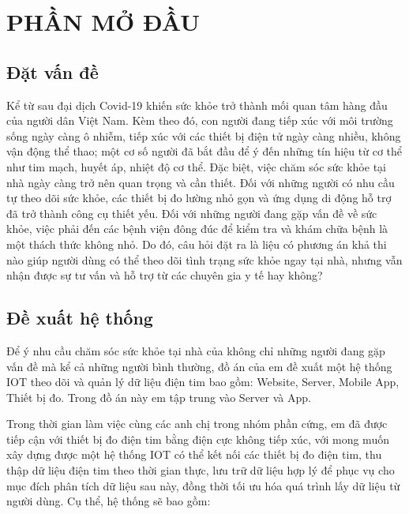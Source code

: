 
\section*{PHẦN MỞ ĐẦU}
\subsection*{Đặt vấn đề} 

Kể từ sau đại dịch Covid-19 khiến sức khỏe trở thành mối quan tâm hàng đầu của người dân Việt Nam. Kèm theo đó, con người đang tiếp xúc với môi trường sống ngày càng ô nhiễm, 
tiếp xúc với các thiết bị điện tử ngày càng nhiều, không vận động thể thao; một cơ số người đã bắt đầu để ý đến những tín hiệu từ cơ thể như tim mạch, huyết áp, nhiệt độ cơ thể.
Đặc biệt, việc chăm sóc sức khỏe tại nhà ngày càng trở nên quan trọng và cần thiết. 
Đối với những người có nhu cầu tự theo dõi sức khỏe, các thiết bị đo lường nhỏ gọn và ứng dụng di động hỗ trợ đã trở thành công cụ thiết yếu. 
Đối với những người đang gặp vấn đề về sức khỏe, việc phải đến các bệnh viện đông đúc để kiểm tra và khám chữa bệnh là một thách thức không nhỏ. 
Do đó, câu hỏi đặt ra là liệu có phương án khả thi nào giúp người dùng có thể theo dõi tình trạng sức khỏe ngay tại nhà, 
nhưng vẫn nhận được sự tư vấn và hỗ trợ từ các chuyên gia y tế hay không?

\subsection*{Đề xuất hệ thống}

Để ý nhu cầu chăm sóc sức khỏe tại nhà của không chỉ những người đang gặp vấn đề mà kể cả những người bình thường, đồ án của em đề xuất một hệ thống IOT
theo dõi và quản lý dữ liệu điện tim bao gồm: Website, Server, Mobile App, Thiết bị đo. Trong đồ án này em tập trung vào Server và App.

Trong thời gian làm việc cùng các anh chị trong nhóm phần cứng, em đã được tiếp cận với thiết bị đo điện tim bằng điện cực không tiếp xúc, 
với mong muốn xây dựng được một hệ thống IOT có thể kết nối các thiết bị đo điện tim, thu thập dữ liệu điện tim theo thời gian thực, lưu trữ dữ liệu hợp lý
để phục vụ cho mục đích phân tích dữ liệu sau này, đồng thời tối ưu hóa quá trình lấy dữ liệu từ người dùng.
Cụ thể, hệ thống sẽ bao gồm:

